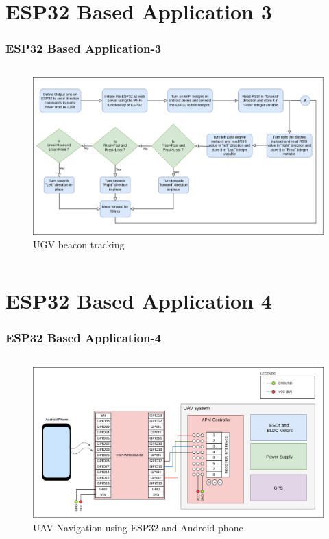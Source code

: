 \documentclass{beamer}
\begin{document}
\section{ESP32 Based Application 3}
\begin{frame}
\frametitle{ESP32 Based Application-3}
\begin{columns}
	\begin{figure}[h!]
  		\centering
  		\includegraphics[width=\linewidth]{./figs/Flow_UGV_beacon.png}
  		\caption{UGV beacon tracking}
  		\label{Flow_UGV_beacon}
	\end{figure}
\end{columns}
\end{frame}

\section{ESP32 Based Application 4}
\begin{frame}
\frametitle{ESP32 Based Application-4}
\begin{columns}
	\begin{figure}[h!]
  		\centering
  		\includegraphics[width=\linewidth]{./figs/Wiring_UAV_ESP32_commlink.png}
  		\caption{UAV Navigation using ESP32 and Android phone}
  		\label{Wiring_UAV_ESP32_commlink}
	\end{figure}
\end{columns}
\end{frame}
\end{document}
